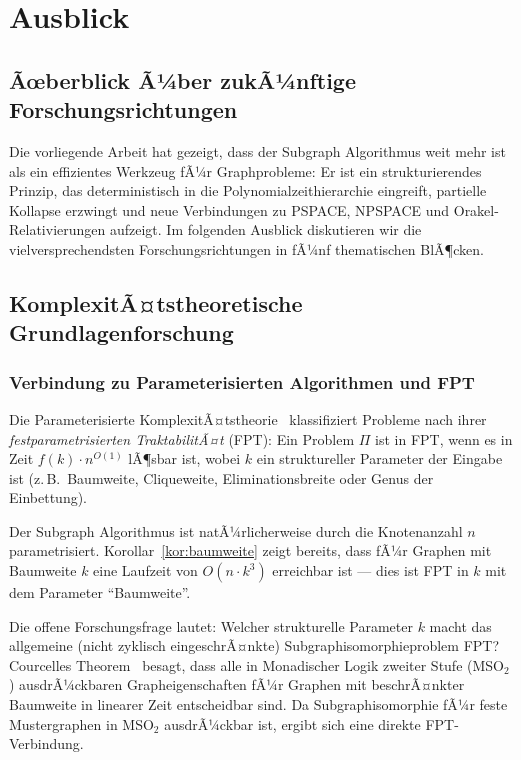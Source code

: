﻿\documentclass[a4paper,12pt]{article}
\theoremstyle{definition}
\begin{document}
\section{Ausblick}
\label{sec:ausblick}

\subsection{Ãœberblick Ã¼ber zukÃ¼nftige Forschungsrichtungen}

Die vorliegende Arbeit hat gezeigt, dass der Subgraph Algorithmus weit mehr ist
als ein effizientes Werkzeug fÃ¼r Graphprobleme: Er ist ein strukturierendes Prinzip,
das deterministisch in die Polynomialzeithierarchie eingreift, partielle Kollapse
erzwingt und neue Verbindungen zu PSPACE, NPSPACE und Orakel-Relativierungen aufzeigt.
Im folgenden Ausblick diskutieren wir die vielversprechendsten Forschungsrichtungen
in fÃ¼nf thematischen BlÃ¶cken.

\subsection{KomplexitÃ¤tstheoretische Grundlagenforschung}

\subsubsection{Verbindung zu Parameterisierten Algorithmen und FPT}

Die Parameterisierte KomplexitÃ¤tstheorie~\cite{downey1999parameterized} klassifiziert
Probleme nach ihrer \emph{festparametrisierten TraktabilitÃ¤t} (FPT):
Ein Problem $\Pi$ ist in FPT, wenn es in Zeit $f(k) \cdot n^{O(1)}$ lÃ¶sbar ist,
wobei $k$ ein struktureller Parameter der Eingabe ist (z.\,B.\ Baumweite, Cliqueweite,
Eliminationsbreite oder Genus der Einbettung).

Der Subgraph Algorithmus ist natÃ¼rlicherweise durch die Knotenanzahl $n$ parametrisiert.
Korollar~\ref{kor:baumweite} zeigt bereits, dass fÃ¼r Graphen mit Baumweite $k$
eine Laufzeit von $O(n \cdot k^3)$ erreichbar ist --- dies ist FPT in $k$ mit
dem Parameter ``Baumweite''.

Die offene Forschungsfrage lautet: Welcher strukturelle Parameter $k$ macht das
allgemeine (nicht zyklisch eingeschrÃ¤nkte) Subgraphisomorphieproblem FPT?
Courcelles Theorem~\cite{courcelle1990monadic} besagt, dass alle in Monadischer
Logik zweiter Stufe (MSO$_2$) ausdrÃ¼ckbaren Grapheigenschaften fÃ¼r Graphen
mit beschrÃ¤nkter Baumweite in linearer Zeit entscheidbar sind.
Da Subgraphisomorphie fÃ¼r feste Mustergraphen in MSO$_2$ ausdrÃ¼ckbar ist,
ergibt sich eine direkte FPT-Verbindung.
\end{document}
